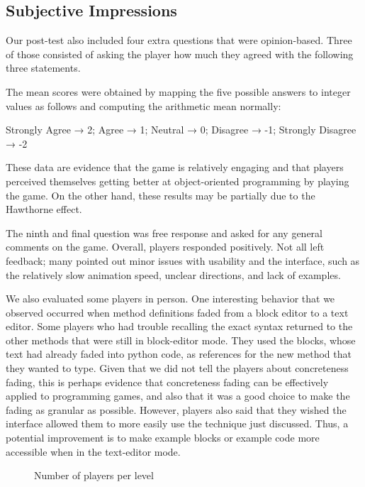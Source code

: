 \documentclass[12pt,notitlepage]{article}
\begin{document}
\subsection{Subjective Impressions}

Our post-test also included four extra questions that were opinion-based.
Three of those consisted of asking the player how much they agreed with
the following three statements.



The mean scores were obtained by mapping the five possible answers to integer
values as follows and computing the arithmetic mean normally:\\
\centerline{Strongly Agree → 2; Agree → 1; Neutral → 0; Disagree → -1; Strongly Disagree → -2}

These data are evidence that the game is relatively engaging and that players
perceived themselves getting better at object-oriented programming by playing
the game. On the other hand, these results may be partially due to the
Hawthorne effect.

The ninth and final question was free response and asked for any general
comments on the game. Overall, players responded positively. Not all left
feedback; many pointed out minor issues with usability and the interface,
such as the relatively slow animation speed, unclear directions, and lack
of examples.

We also evaluated some players in person.
One interesting behavior that we observed occurred when method definitions
faded from a block editor to a text editor. Some players who had trouble
recalling the exact syntax returned to the other methods that were still in
block-editor mode. They used the blocks, whose text had already faded into
python code, as references for the new method that they wanted to type. Given
that we did not tell the players about concreteness fading, this is perhaps
evidence that concreteness fading can be effectively applied to programming
games, and also that it was a good choice to make the fading as granular as
possible. However, players also said that they wished the interface allowed
them to more easily use the technique just discussed. Thus, a potential
improvement is to make example blocks or example code more accessible when
in the text-editor mode.

\begin{figure}
  \centering
  \caption{Number of players per level}\label{fig:num-players}
\end{figure}
\end{document}
